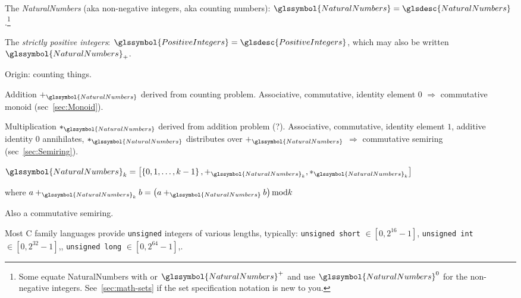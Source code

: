 \lstset{language=Clojure}

\label{sec:Natural-numbers}

The \textit{\gls{NaturalNumbers}} 
(aka non-negative integers, aka counting
numbers):\label{NaturalNumbers}
$\glssymbol{NaturalNumbers} = 
\glsdesc{NaturalNumbers}$.\footnote{ 
Some
equate \gls{NaturalNumbers} with  
or $\glssymbol{NaturalNumbers}^{+}$ and use
$\glssymbol{NaturalNumbers}^{0}$ for the non-negative integers. 
See~\autoref{sec:math-sets} if the set specification
notation is new to you.}

The \textit{strictly positive integers}: 
$\glssymbol{PositiveIntegers} = \glsdesc{PositiveIntegers}$, which 
may also be written $\glssymbol{NaturalNumbers}_{+}$.

Origin: counting things.

Addition $+_{\glssymbol{NaturalNumbers}}$ 
derived from counting problem.
Associative, commutative, identity element $0$ $\Rightarrow$ 
commutative monoid (sec~\ref{sec:Monoid}).

Multiplication $*_{\glssymbol{NaturalNumbers}}$
derived from addition problem (?).
Associative, commutative, identity element $1$,
additive identity $0$ annihilates,
$*_{\glssymbol{NaturalNumbers}}$ distributes over 
$+_{\glssymbol{NaturalNumbers}}$ 
 $\Rightarrow$
commutative semiring 
(sec~\ref{sec:Semiring}).



${\glssymbol{NaturalNumbers}}_{k} = 
\left[ \left\{ 0, 1, \ldots, k-1 \right\},
+_{\glssymbol{NaturalNumbers}_{k}},
*_{\glssymbol{NaturalNumbers}_{k}} \right]$

where
$a +_{\glssymbol{NaturalNumbers}_{k}} b =
\left( a +_{\glssymbol{NaturalNumbers}} b \right) \text{mod} k$

Also a commutative semiring.

\label{sec:unsigned-int}

Most C family languages provide \texttt{unsigned} integers
of various lengths, typically: 
\texttt{unsigned short} $\in \left[ 0, 2^{16} - 1 \right]$,
\texttt{unsigned int} $\in \left[ 0, 2^{32} - 1 \right]$,,
\texttt{unsigned long} $\in \left[ 0, 2^{64} - 1 \right]$,.


